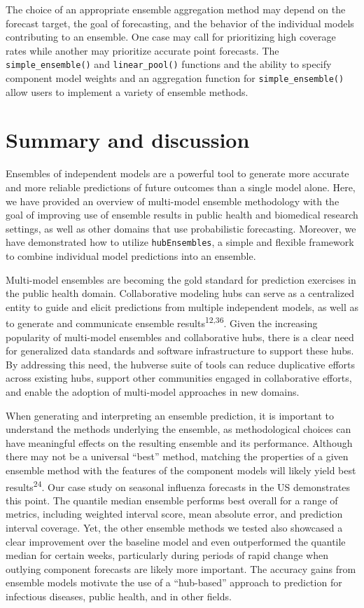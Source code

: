 \documentclass[
]{article}
\begin{document}
The choice of an appropriate ensemble aggregation method may depend on
the forecast target, the goal of forecasting, and the behavior of the
individual models contributing to an ensemble. One case may call for
prioritizing high coverage rates while another may prioritize accurate
point forecasts. The \texttt{simple\_ensemble()} and
\texttt{linear\_pool()} functions and the ability to specify component
model weights and an aggregation function for
\texttt{simple\_ensemble()} allow users to implement a variety of
ensemble methods.

\section{Summary and discussion}\label{sec-conclusions}

Ensembles of independent models are a powerful tool to generate more
accurate and more reliable predictions of future outcomes than a single
model alone. Here, we have provided an overview of multi-model ensemble
methodology with the goal of improving use of ensemble results in public
health and biomedical research settings, as well as other domains that
use probabilistic forecasting. Moreover, we have demonstrated how to
utilize \texttt{hubEnsembles}, a simple and flexible framework to
combine individual model predictions into an ensemble.

Multi-model ensembles are becoming the gold standard for prediction
exercises in the public health domain. Collaborative modeling hubs can
serve as a centralized entity to guide and elicit predictions from
multiple independent models, as well as to generate and communicate
ensemble results\textsuperscript{12,36}. Given the increasing popularity
of multi-model ensembles and collaborative hubs, there is a clear need
for generalized data standards and software infrastructure to support
these hubs. By addressing this need, the hubverse suite of tools can
reduce duplicative efforts across existing hubs, support other
communities engaged in collaborative efforts, and enable the adoption of
multi-model approaches in new domains.

When generating and interpreting an ensemble prediction, it is important
to understand the methods underlying the ensemble, as methodological
choices can have meaningful effects on the resulting ensemble and its
performance. Although there may not be a universal ``best'' method,
matching the properties of a given ensemble method with the features of
the component models will likely yield best results\textsuperscript{24}.
Our case study on seasonal influenza forecasts in the US demonstrates
this point. The quantile median ensemble performs best overall for a
range of metrics, including weighted interval score, mean absolute
error, and prediction interval coverage. Yet, the other ensemble methods
we tested also showcased a clear improvement over the baseline model and
even outperformed the quantile median for certain weeks, particularly
during periods of rapid change when outlying component forecasts are
likely more important. The accuracy gains from ensemble models motivate
the use of a ``hub-based'' approach to prediction for infectious
diseases, public health, and in other fields.
\end{document}
